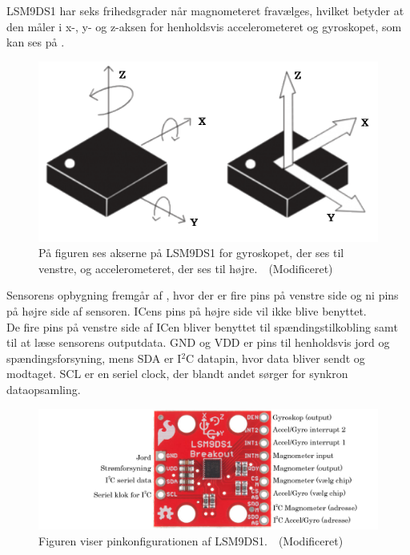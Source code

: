 LSM9DS1 har seks frihedsgrader når magnometeret fravælges, hvilket betyder at den måler i x-, y- og z-aksen for henholdsvis accelerometeret og gyroskopet, som kan ses på .~\citep{STMicroelectronics2016}\newline 
\begin{figure}[H]
	\centering
	\includegraphics[scale=0.4]{figures/cDesign/LSM9DS1.png}
	\caption{På figuren ses akserne på LSM9DS1 for gyroskopet, der ses til venstre, og accelerometeret, der ses til højre.~\citep{Jimb02016}~(Modificeret)}
	\label{vores_IC}
\end{figure}\vspace{-0.25cm}
Sensorens opbygning fremgår af , hvor der er fire pins på venstre side og ni pins på højre side af sensoren. ICens pins på højre side vil ikke blive benyttet.\\
De fire pins på venstre side af ICen bliver benyttet til spændingstilkobling samt til at læse sensorens outputdata. GND og VDD er pins til henholdsvis jord og spændingsforsyning, mens SDA er I$^2$C datapin, hvor data bliver sendt og modtaget. SCL er en seriel clock, der blandt andet sørger for synkron dataopsamling.
\begin{figure}[H]
	\centering
	\includegraphics[scale=0.3]{figures/cDesign/accelerometeret.png}
	\caption{Figuren viser pinkonfigurationen af LSM9DS1.~\citep{Jimb02016}~(Modificeret)}
	\label{fig:IC_pins}
\end{figure}\vspace{-0.25cm}
